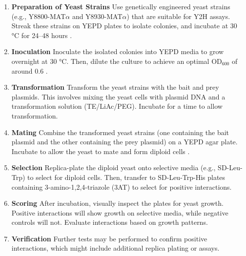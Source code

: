 \documentclass{article}
\newcounter{subsubsubsection}[subsubsection]
\begin{document}
\begin{enumerate}

\item \textbf{Preparation of Yeast Strains}
Use genetically engineered yeast strains (e.g., Y8800-MAT$\alpha$ and Y8930-MAT$\alpha$) that are suitable for Y2H assays. Streak these strains on YEPD plates to isolate colonies, and incubate at 30 °C for 24--48 hours .

\item \textbf{Inoculation}
Inoculate the isolated colonies into YEPD media to grow overnight at 30 °C. Then, dilute the culture to achieve an optimal OD$_{600}$ of around 0.6 .

\item \textbf{Transformation}
Transform the yeast strains with the bait and prey plasmids. This involves mixing the yeast cells with plasmid DNA and a transformation solution (TE/LiAc/PEG). Incubate for a time to allow transformation.

\item \textbf{Mating}
Combine the transformed yeast strains (one containing the bait plasmid and the other containing the prey plasmid) on a YEPD agar plate. Incubate to allow the yeast to mate and form diploid cells .

\item \textbf{Selection}
Replica-plate the diploid yeast onto selective media (e.g., SD-Leu-Trp) to select for diploid cells. Then, transfer to SD-Leu-Trp-His plates containing 3-amino-1,2,4-triazole (3AT) to select for positive interactions.

\item \textbf{Scoring}
After incubation, visually inspect the plates for yeast growth. Positive interactions will show growth on selective media, while negative controls will not. Evaluate interactions based on growth patterns.

\item \textbf{Verification}
Further tests may be performed to confirm positive interactions, which might include additional replica plating or assays.

\end{enumerate}
\end{document}
